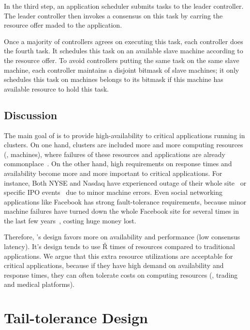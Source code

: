 In the third step, an application scheduler submits tasks to the leader 
controller. The leader controller then invokes a consensus on this task by 
carring the resource offer maded to the application.

Once a majority of controllers agrees on executing this task, each controller 
does the fourth task. It schedules this task on an available slave machine 
according to the resource offer. To avoid controllers putting the same task on 
the same slave machine, each controller maintains a disjoint bitmask of slave 
machines; it only schedules this task on machines belongs to its bitmask if this 
machine has available resource to hold this task.


\subsection{Discussion} \label{sec:discuss}

The main goal of \xxx is to provide high-availability to critical applications 
running in clusters. On one hand, clusters are included more and more computing 
resources (\eg, machines), where failures of these resources and applications 
are already commonplace~\cite{facebook:failures}. On the other hand, 
high requirements on response times and availability become more and more 
important to critical applications. For instance, Both NYSE and Nasdaq have 
experienced outage of their whole site~\cite{nyse:crash} or specific IPO 
events~\cite{facebook:ipo:crash} due to minor machine errors.  Even social 
networking applications like Facebook has strong fault-tolerance requirements, 
because minor machine failures have turned down the whole Facebook site for 
several times in the last few years~\cite{facebook:failures}, costing huge 
money lost. 

Therefore, \xxx's design favors more on availability and performance 
(low consensus latency). It's design tends to use \v{R} times of resources 
compared to traditional applications. We argue that this extra resource 
utilizations are acceptable for critical applications, because if they have high 
demand on availability and response times, they can often tolerate costs on 
computing resources (\eg, trading and medical platforms).


\section{Tail-tolerance Design} \label{sec:tail}

